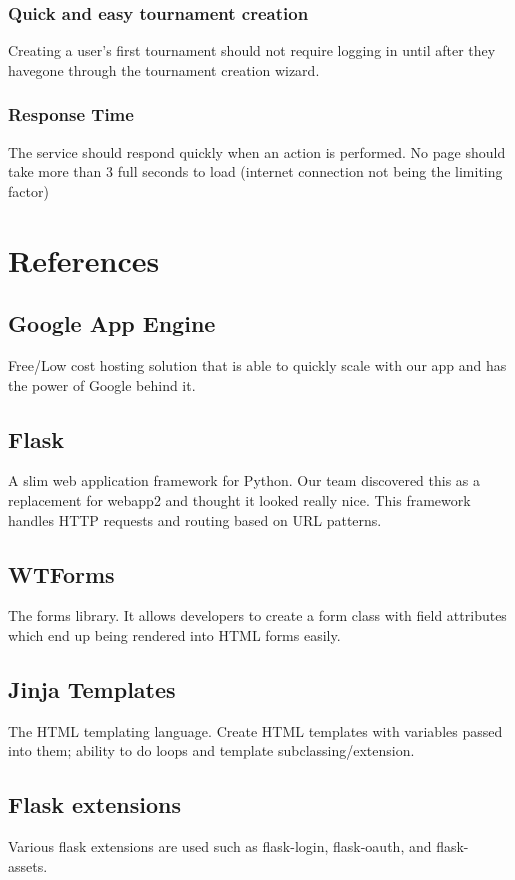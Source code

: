 \documentclass{article}
\begin{document}
\subsubsection{Quick and easy tournament creation}
Creating a user’s first tournament should not require logging in until after they havegone through the tournament creation wizard.

\subsubsection{Response Time}
The service should respond quickly when an action is performed. No page should take more than 3 full seconds to load (internet connection not being the limiting factor)



\newpage
\section{References}
\subsection{Google App Engine}
Free/Low cost hosting solution that is able to quickly scale with our app and has the power of Google behind it.

\subsection{Flask}
A slim web application framework for Python. Our team discovered this as a replacement for webapp2 and thought it looked really nice. This framework handles HTTP requests and routing based on URL patterns.

\subsection{WTForms}
The forms library. It allows developers to create a form class with field attributes which end up being rendered into HTML forms easily.

\subsection{Jinja Templates}
The HTML templating language. Create HTML templates with variables passed into them; ability to do loops and template subclassing/extension.

\subsection{Flask extensions}
Various flask extensions are used such as flask-login, flask-oauth, and flask- assets.
\end{document}
